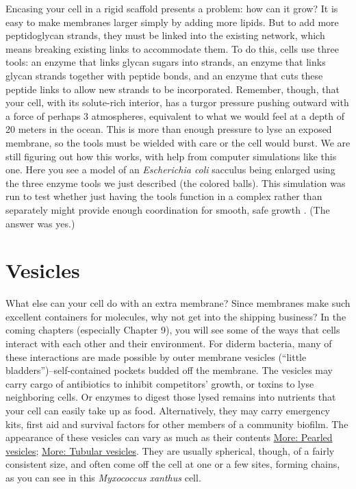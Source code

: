 \documentclass[]{tufte-book}
\begin{document}
Encasing your cell in a rigid scaffold presents a problem: how can it grow? It is easy to make membranes larger simply by adding more lipids. But to add more peptidoglycan strands, they must be linked into the existing network, which means breaking existing links to accommodate them. To do this, cells use three tools: an enzyme that links glycan sugars into strands, an enzyme that links glycan strands together with peptide bonds, and an enzyme that cuts these peptide links to allow new strands to be incorporated. Remember, though, that your cell, with its solute-rich interior, has a turgor pressure pushing outward with a force of perhaps 3 atmospheres, equivalent to what we would feel at a depth of 20 meters in the ocean. This is more than enough pressure to lyse an exposed membrane, so the tools must be wielded with care or the cell would burst. We are still figuring out how this works, with help from computer simulations like this one. Here you see a model of an \emph{Escherichia coli} sacculus being enlarged using the three enzyme tools we just described (the colored balls). This simulation was run to test whether just having the tools function in a complex rather than separately might provide enough coordination for smooth, safe growth \citep{nguyen2015}. (The answer was yes.)

\hypertarget{vesicles}{%
\section{Vesicles}\label{vesicles}}

What else can your cell do with an extra membrane? Since membranes make such excellent containers for molecules, why not get into the shipping business? In the coming chapters (especially Chapter 9), you will see some of the ways that cells interact with each other and their environment. For diderm bacteria, many of these interactions are made possible by outer membrane vesicles (``little bladders'')--self-contained pockets budded off the membrane. The vesicles may carry cargo of antibiotics to inhibit competitors' growth, or toxins to lyse neighboring cells. Or enzymes to digest those lysed remains into nutrients that your cell can easily take up as food. Alternatively, they may carry emergency kits, first aid and survival factors for other members of a community biofilm. The appearance of these vesicles can vary as much as their contents \protect\hyperlink{Pearled_vesicles}{More: Pearled vesicles}; \protect\hyperlink{Tubular_vesicles}{More: Tubular vesicles}. They are usually spherical, though, of a fairly consistent size, and often come off the cell at one or a few sites, forming chains, as you can see in this \emph{Myxococcus xanthus} cell.
\end{document}
